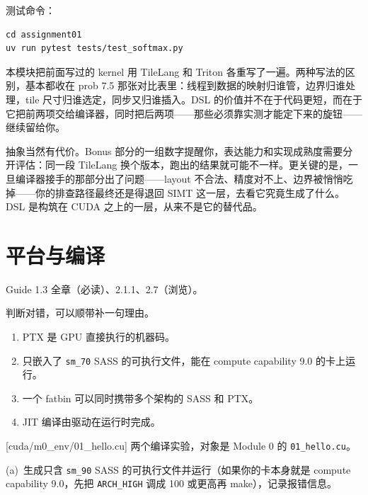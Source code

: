 \documentclass[11pt,a4paper,fontset=none]{ctexart}
\begin{document}
测试命令：

\begin{lstlisting}
cd assignment01
uv run pytest tests/test_softmax.py
\end{lstlisting}

\begin{lookback}
本模块把前面写过的 kernel 用 TileLang 和 Triton 各重写了一遍。两种写法的区别，基本都收在 prob 7.5 那张对比表里：线程到数据的映射归谁管，边界归谁处理，tile 尺寸归谁选定，同步又归谁插入。DSL 的价值并不在于代码更短，而在于它把前两项交给编译器，同时把后两项——那些必须靠实测才能定下来的旋钮——继续留给你。

抽象当然有代价。Bonus 部分的一组数字提醒你，表达能力和实现成熟度需要分开评估：同一段 TileLang 换个版本，跑出的结果就可能不一样。更关键的是，一旦编译器接手的那部分出了问题——layout 不合法、精度对不上、边界被悄悄吃掉——你的排查路径最终还是得退回 SIMT 这一层，去看它究竟生成了什么。DSL 是构筑在 CUDA 之上的一层，从来不是它的替代品。
\end{lookback}

\section{平台与编译}

\begin{reading}
Guide 1.3 全章（必读）、2.1.1、2.7（浏览）。
\end{reading}

判断对错，可以顺带补一句理由。
\begin{enumerate}[label=(\alph*)]
  \item PTX 是 GPU 直接执行的机器码。
  \item 只嵌入了 \texttt{sm\_70} SASS 的可执行文件，能在 compute capability 9.0 的卡上运行。
  \item 一个 fatbin 可以同时携带多个架构的 SASS 和 PTX。
  \item JIT 编译由驱动在运行时完成。
\end{enumerate}

[cuda/m0\_env/01\_hello.cu]
两个编译实验，对象是 Module 0 的 \texttt{01\_hello.cu}。

(a)~生成只含 \texttt{sm\_90} SASS 的可执行文件并运行（如果你的卡本身就是 compute capability 9.0，先把 \texttt{ARCH\_HIGH} 调成 100 或更高再 make），记录报错信息。
\end{document}
